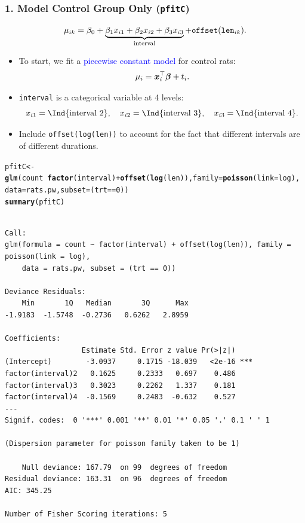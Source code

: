 \documentclass[oneside]{book}\usepackage[]{graphicx}\usepackage[svgnames]{xcolor}
\makeatletter
\newcommand{\hlnum}[1]{\textcolor[rgb]{0.686,0.059,0.569}{#1}}%
\newcommand{\hlopt}[1]{\textcolor[rgb]{0,0,0}{#1}}%
\newcommand{\hlstd}[1]{\textcolor[rgb]{0.345,0.345,0.345}{#1}}%
\newcommand{\hlkwb}[1]{\textcolor[rgb]{0.69,0.353,0.396}{#1}}%
\newcommand{\hlkwc}[1]{\textcolor[rgb]{0.333,0.667,0.333}{#1}}%
\newcommand{\hlkwd}[1]{\textcolor[rgb]{0.737,0.353,0.396}{\textbf{#1}}}%
\newenvironment{kframe}{%
 \def\at@end@of@kframe{}%
 \ifinner\ifhmode%
  \def\at@end@of@kframe{\end{minipage}}%
  \begin{minipage}{\columnwidth}%
 \fi\fi%
 \def\FrameCommand##1{\hskip\@totalleftmargin \hskip-\fboxsep
 \colorbox{shadecolor}{##1}\hskip-\fboxsep
     \hskip-\linewidth \hskip-\@totalleftmargin \hskip\columnwidth}%
 \MakeFramed {\advance\hsize-\width
   \@totalleftmargin\z@ \linewidth\hsize
   \@setminipage}}%
 {\par\unskip\endMakeFramed%
 \at@end@of@kframe}
\newenvironment{knitrout}{}{} %
\let\log\relax%
\providecommand{\Vector}[1]{\bm{#1}}%
\makeatother
\begin{document}
\subsubsection*{1. Model Control Group Only (\texttt{pfitC})}
\[ \log{\mu_{ik}}=\beta_0+\underbrace{\beta_1x_{i1}+\beta_2x_{i2}+\beta_3x_{i3}}_{\text{interval}}+\texttt{offset}(\log{\texttt{len}_{ik}}). \]
\begin{itemize}
    \item To start, we fit a \textcolor{Blue}{piecewise constant model} for control rats:
          \[ \log{\mu_i}=\Vector{x}_i^\top \Vector{\beta}+\log{t_i}. \]
    \item \texttt{interval} is a categorical variable at 4 levels:
          \[ x_{i1}=\Ind{\text{interval 2}},\quad x_{i2}=\Ind{\text{interval 3}},\quad x_{i3}=\Ind{\text{interval 4}}. \]
    \item Include \texttt{offset(log(len))} to account for the fact that different intervals are of
          different durations.
\end{itemize}
\begin{knitrout}
\color{fgcolor}\begin{kframe}
\begin{alltt}
\hlstd{pfitC} \hlkwb{<-} \hlkwd{glm}\hlstd{(count} \hlopt{~} \hlkwd{factor}\hlstd{(interval)} \hlopt{+} \hlkwd{offset}\hlstd{(}\hlkwd{log}\hlstd{(len)),} \hlkwc{family} \hlstd{=} \hlkwd{poisson}\hlstd{(}\hlkwc{link} \hlstd{= log),}
  \hlkwc{data} \hlstd{= rats.pw,} \hlkwc{subset} \hlstd{= (trt} \hlopt{==} \hlnum{0}\hlstd{))}
\hlkwd{summary}\hlstd{(pfitC)}
\end{alltt}
\begin{verbatim}

Call:
glm(formula = count ~ factor(interval) + offset(log(len)), family = poisson(link = log), 
    data = rats.pw, subset = (trt == 0))

Deviance Residuals: 
    Min       1Q   Median       3Q      Max  
-1.9183  -1.5748  -0.2736   0.6262   2.8959  

Coefficients:
                  Estimate Std. Error z value Pr(>|z|)    
(Intercept)        -3.0937     0.1715 -18.039   <2e-16 ***
factor(interval)2   0.1625     0.2333   0.697    0.486    
factor(interval)3   0.3023     0.2262   1.337    0.181    
factor(interval)4  -0.1569     0.2483  -0.632    0.527    
---
Signif. codes:  0 '***' 0.001 '**' 0.01 '*' 0.05 '.' 0.1 ' ' 1

(Dispersion parameter for poisson family taken to be 1)

    Null deviance: 167.79  on 99  degrees of freedom
Residual deviance: 163.31  on 96  degrees of freedom
AIC: 345.25

Number of Fisher Scoring iterations: 5
\end{verbatim}
\end{kframe}
\end{knitrout}
\end{document}
